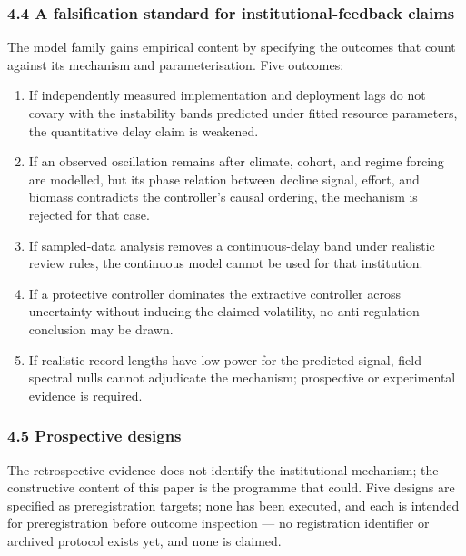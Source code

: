 \documentclass[11pt]{article}
\providecommand{\tightlist}{\setlength{\itemsep}{0pt}\setlength{\parskip}{0pt}}
\begin{document}
\subsubsection{4.4 A falsification standard for institutional-feedback
claims}\label{a-falsification-standard-for-institutional-feedback-claims}

The model family gains empirical content by specifying the outcomes that
count against its mechanism and parameterisation. Five outcomes:

\begin{enumerate}
\def\labelenumi{\arabic{enumi}.}
\tightlist
\item
  If independently measured implementation and deployment lags do not
  covary with the instability bands predicted under fitted resource
  parameters, the quantitative delay claim is weakened.
\item
  If an observed oscillation remains after climate, cohort, and regime
  forcing are modelled, but its phase relation between decline signal,
  effort, and biomass contradicts the controller's causal ordering, the
  mechanism is rejected for that case.
\item
  If sampled-data analysis removes a continuous-delay band under
  realistic review rules, the continuous model cannot be used for that
  institution.
\item
  If a protective controller dominates the extractive controller across
  uncertainty without inducing the claimed volatility, no
  anti-regulation conclusion may be drawn.
\item
  If realistic record lengths have low power for the predicted signal,
  field spectral nulls cannot adjudicate the mechanism; prospective or
  experimental evidence is required.
\end{enumerate}

\subsubsection{4.5 Prospective designs}\label{prospective-designs}

The retrospective evidence does not identify the institutional
mechanism; the constructive content of this paper is the programme that
could. Five designs are specified as preregistration targets; none has
been executed, and each is intended for preregistration before outcome
inspection --- no registration identifier or archived protocol exists
yet, and none is claimed.
\end{document}
